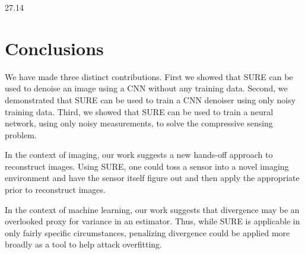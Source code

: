 \documentclass{article}
\begin{document}
27.14 \\%



\section{Conclusions}

We have made three distinct contributions. 
First we showed that SURE can be used to denoise an image using a CNN without any training data. 
Second, we demonstrated that SURE can be used to train a CNN denoiser using only noisy training data. 
Third, we showed that SURE can be used to train a neural network, using only noisy measurements, to solve the compressive sensing problem. 

In the context of imaging, our work suggests a new hands-off approach to reconstruct images. Using SURE, one could toss a sensor into a novel imaging environment and have the sensor itself figure out and then apply the appropriate prior to reconstruct images.

In the context of machine learning, our work suggests that divergence may be an overlooked proxy for variance in an estimator. Thus, while SURE is applicable in only fairly specific circumstances, penalizing divergence could be applied more broadly as a tool to help attack overfitting.










{\small
	
% 	
	
}




\end{document}
